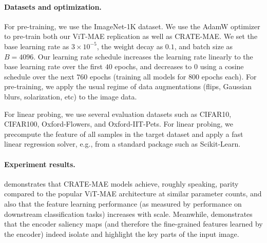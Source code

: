 \documentclass[../../book-main.tex]{subfiles}
\begin{document}
\paragraph{Datasets and optimization.} For pre-training, we use the ImageNet-1K dataset. We use the AdamW optimizer to pre-train both our ViT-MAE replication as well as CRATE-MAE. We set the base learning rate as \(3 \times 10^{-5}\), the weight decay as \(0.1\), and batch size as \(B = 4096\). Our learning rate schedule increases the learning rate linearly to the base learning rate over the first \(40\) epochs, and decreases to \(0\) using a cosine schedule over the next \(760\) epochs (training all models for \(800\) epochs each). For pre-training, we apply the usual regime of data augmentations (flips, Gaussian blurs, solarization, etc) to the image data.

For linear probing, we use several evaluation datasets such as CIFAR10, CIFAR100, Oxford-Flowers, and Oxford-IIT-Pets. For linear probing, we precompute the feature of all samples in the target dataset and apply a fast linear regression solver, e.g., from a standard package such as Scikit-Learn.

\paragraph{Experiment results.}  demonstrates that CRATE-MAE models achieve, roughly speaking, parity compared to the popular ViT-MAE architecture at similar parameter counts, and also that the feature learning performance (as measured by performance on downstream classification tasks) increases with scale. Meanwhile,  demonstrates that the encoder saliency maps (and therefore the fine-grained features learned by the encoder) indeed isolate and highlight the key parts of the input image.
\end{document}
